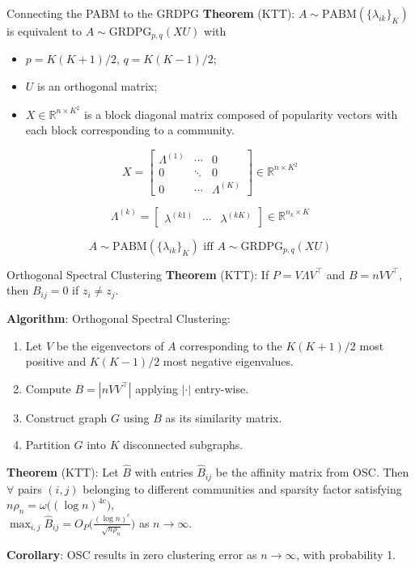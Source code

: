 \documentclass[
  ignorenonframetext,
]{beamer}
\providecommand{\tightlist}{%
  \setlength{\itemsep}{0pt}\setlength{\parskip}{0pt}}
\begin{document}
\begin{frame}{Connecting the PABM to the GRDPG}
\protect\hypertarget{connecting-the-pabm-to-the-grdpg}{}
\textbf{Theorem} (KTT): \(A \sim \text{PABM}(\{\lambda_{ik}\}_K)\) is
equivalent to \(A \sim \text{GRDPG}_{p, q}(X U)\) with

\begin{itemize}
\tightlist
\item
  \(p = K (K + 1) / 2\), \(q = K (K - 1) / 2\);
\item
  \(U\) is an orthogonal matrix;
\item
  \(X \in \mathbb{R}^{n \times K^2}\) is a block diagonal matrix
  composed of popularity vectors with each block corresponding to a
  community.
\end{itemize}

\[X = \begin{bmatrix}
\Lambda^{(1)} & \cdots & 0 \\
0 & \ddots & 0 \\
0 & \cdots & \Lambda^{(K)}
\end{bmatrix} 
\in \mathbb{R}^{n \times K^2}\]

\[\Lambda^{(k)} = \begin{bmatrix} 
\lambda^{(k1)} & \cdots & \lambda^{(kK)} 
\end{bmatrix} 
\in \mathbb{R}^{n_k \times K}\]

\[A \sim \text{PABM}(\{\lambda_{ik}\}_K) \text{ iff } A \sim \text{GRDPG}_{p, q}(X U)\]
\end{frame}

\begin{frame}{Orthogonal Spectral Clustering}
\protect\hypertarget{orthogonal-spectral-clustering}{}
\textbf{Theorem} (KTT): If \(P = V \Lambda V^\top\) and
\(B = n V V^\top\),\\
then \(B_{ij} = 0\) if \(z_i \neq z_j\).

\textbf{Algorithm}: Orthogonal Spectral Clustering:

\begin{enumerate}
\tightlist
\item
  Let \(V\) be the eigenvectors of \(A\) corresponding to the
  \(K (K+1)/2\) most positive and \(K (K-1) / 2\) most negative
  eigenvalues.
\item
  Compute \(B = |n V V^\top|\) applying \(|\cdot|\) entry-wise.
\item
  Construct graph \(G\) using \(B\) as its similarity matrix.
\item
  Partition \(G\) into \(K\) disconnected subgraphs.
\end{enumerate}

\textbf{Theorem} (KTT): Let \(\hat{B}\) with entries \(\hat{B}_{ij}\) be
the affinity matrix from OSC. Then \(\forall\) pairs \((i, j)\)
belonging to different communities and sparsity factor satisfying
\(n \rho_n = \omega\big((\log n)^{4c}\big)\),\\
\(\max_{i, j} \hat{B}_{ij} = O_P \Big( \frac{(\log n)^c}{\sqrt{n \rho_n}} \Big)\)
as \(n \to \infty\).

\textbf{Corollary}: OSC results in zero clustering error as
\(n \to \infty\), with probability 1.
\end{frame}
\end{document}
